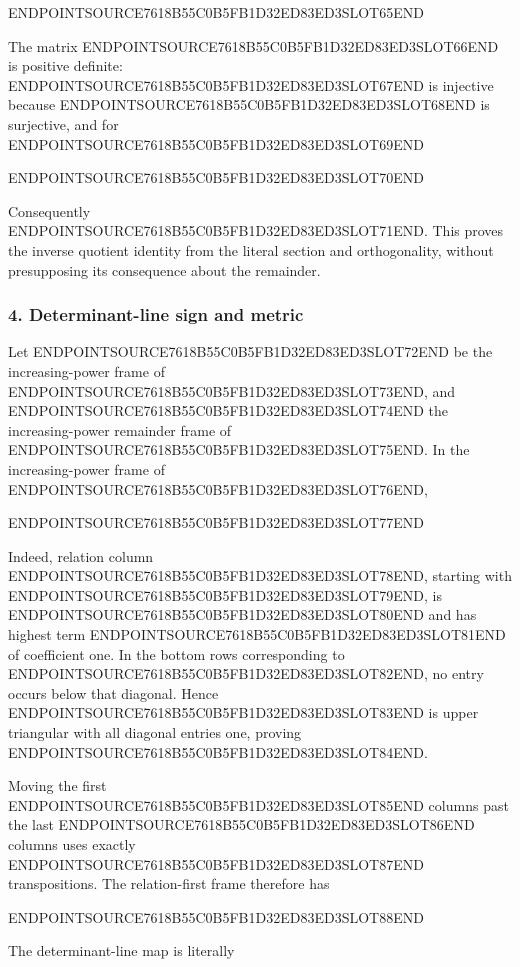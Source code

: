 ENDPOINTSOURCE7618B55C0B5FB1D32ED83ED3SLOT65END

The matrix ENDPOINTSOURCE7618B55C0B5FB1D32ED83ED3SLOT66END is positive definite: ENDPOINTSOURCE7618B55C0B5FB1D32ED83ED3SLOT67END is injective because ENDPOINTSOURCE7618B55C0B5FB1D32ED83ED3SLOT68END is surjective, and for ENDPOINTSOURCE7618B55C0B5FB1D32ED83ED3SLOT69END

ENDPOINTSOURCE7618B55C0B5FB1D32ED83ED3SLOT70END

Consequently ENDPOINTSOURCE7618B55C0B5FB1D32ED83ED3SLOT71END. This proves the inverse quotient identity from the literal section and orthogonality, without presupposing its consequence about the remainder.

\subsubsection{4. Determinant-line sign and metric}\label{endpoint-variation_review--determinant-line-sign-and-metric}

Let ENDPOINTSOURCE7618B55C0B5FB1D32ED83ED3SLOT72END be the increasing-power frame of ENDPOINTSOURCE7618B55C0B5FB1D32ED83ED3SLOT73END, and ENDPOINTSOURCE7618B55C0B5FB1D32ED83ED3SLOT74END the increasing-power remainder frame of ENDPOINTSOURCE7618B55C0B5FB1D32ED83ED3SLOT75END. In the increasing-power frame of ENDPOINTSOURCE7618B55C0B5FB1D32ED83ED3SLOT76END,

ENDPOINTSOURCE7618B55C0B5FB1D32ED83ED3SLOT77END

Indeed, relation column ENDPOINTSOURCE7618B55C0B5FB1D32ED83ED3SLOT78END, starting with ENDPOINTSOURCE7618B55C0B5FB1D32ED83ED3SLOT79END, is ENDPOINTSOURCE7618B55C0B5FB1D32ED83ED3SLOT80END and has highest term ENDPOINTSOURCE7618B55C0B5FB1D32ED83ED3SLOT81END of coefficient one. In the bottom rows corresponding to ENDPOINTSOURCE7618B55C0B5FB1D32ED83ED3SLOT82END, no entry occurs below that diagonal. Hence ENDPOINTSOURCE7618B55C0B5FB1D32ED83ED3SLOT83END is upper triangular with all diagonal entries one, proving ENDPOINTSOURCE7618B55C0B5FB1D32ED83ED3SLOT84END.

Moving the first ENDPOINTSOURCE7618B55C0B5FB1D32ED83ED3SLOT85END columns past the last ENDPOINTSOURCE7618B55C0B5FB1D32ED83ED3SLOT86END columns uses exactly ENDPOINTSOURCE7618B55C0B5FB1D32ED83ED3SLOT87END transpositions. The relation-first frame therefore has

ENDPOINTSOURCE7618B55C0B5FB1D32ED83ED3SLOT88END

The determinant-line map is literally

